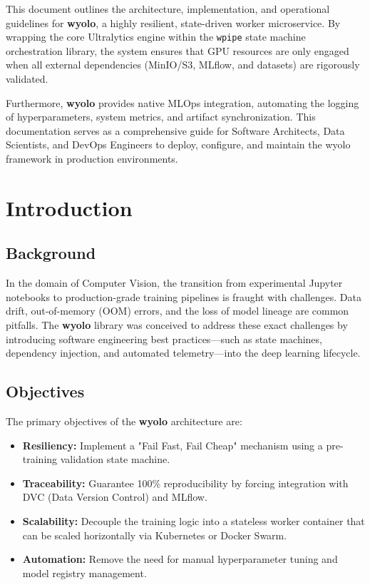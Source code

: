 \documentclass[12pt,a4paper]{report}
\begin{document}
This document outlines the architecture, implementation, and operational guidelines for \textbf{wyolo}, a highly resilient, state-driven worker microservice. By wrapping the core Ultralytics engine within the \texttt{wpipe} state machine orchestration library, the system ensures that GPU resources are only engaged when all external dependencies (MinIO/S3, MLflow, and datasets) are rigorously validated.

Furthermore, \textbf{wyolo} provides native MLOps integration, automating the logging of hyperparameters, system metrics, and artifact synchronization. This documentation serves as a comprehensive guide for Software Architects, Data Scientists, and DevOps Engineers to deploy, configure, and maintain the wyolo framework in production environments.

\chapter{Introduction}
\cleardoublepage
\section{Background}
In the domain of Computer Vision, the transition from experimental Jupyter notebooks to production-grade training pipelines is fraught with challenges. Data drift, out-of-memory (OOM) errors, and the loss of model lineage are common pitfalls. The \textbf{wyolo} library was conceived to address these exact challenges by introducing software engineering best practices---such as state machines, dependency injection, and automated telemetry---into the deep learning lifecycle.

\section{Objectives}
The primary objectives of the \textbf{wyolo} architecture are:
\begin{itemize}
    \item \textbf{Resiliency:} Implement a "Fail Fast, Fail Cheap" mechanism using a pre-training validation state machine.
    \item \textbf{Traceability:} Guarantee 100\% reproducibility by forcing integration with DVC (Data Version Control) and MLflow.
    \item \textbf{Scalability:} Decouple the training logic into a stateless worker container that can be scaled horizontally via Kubernetes or Docker Swarm.
    \item \textbf{Automation:} Remove the need for manual hyperparameter tuning and model registry management.
\end{itemize}
\end{document}
